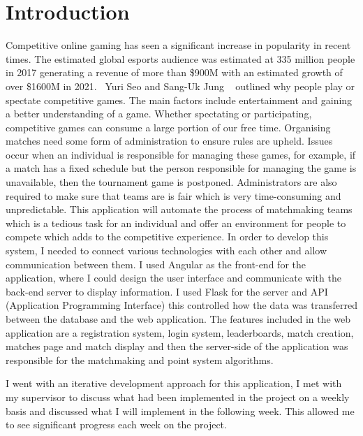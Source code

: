 \chapter{Introduction}
Competitive online gaming has seen a significant increase in popularity in recent times. The estimated global esports audience was estimated at 335 million people in 2017 generating a revenue of more than \$900M with an estimated growth of over \$1600M in 2021.~\cite{sjoblom2019esports} Yuri Seo and Sang-Uk Jung ~\cite{seo2016beyond} outlined why people play or spectate competitive games. The main factors include entertainment and gaining a better understanding of a game. \newline Whether spectating or participating, competitive games can consume a large portion of our free time. \newline Organising matches need some form of administration to ensure rules are upheld. Issues occur when an individual is responsible for managing these games, for example, if a match has a fixed schedule but the person responsible for managing the game is unavailable, then the tournament game is postponed. Administrators are also required to make sure that teams are is fair which is very time-consuming and unpredictable. \newline This application will automate the process of matchmaking teams which is a tedious task for an individual and offer an environment for people to compete which adds to the competitive experience.
\newpage
In order to develop this system, I needed to connect various technologies with each other and allow communication between them. I used Angular as the front-end for the application, where I could design the user interface and communicate with the back-end server to display information. I used Flask for the server and API (Application Programming Interface) this controlled how the data was transferred between the database and the web application.
The features included in the web application are a registration system, login system, leaderboards, match creation, matches page and match display and then the server-side of the application was responsible for the matchmaking and point system algorithms. 
 
I went with an iterative development approach for this application, I met with my supervisor to discuss what had been implemented in the project on a weekly basis and discussed what I will implement in the following week. This allowed me to see significant progress each week on the project.

